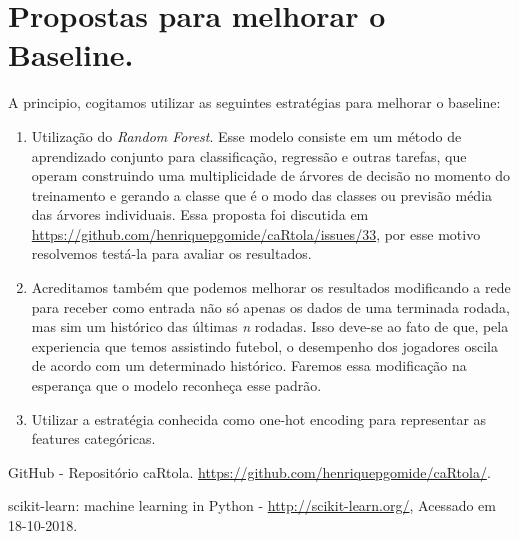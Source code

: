 \documentclass[conference]{IEEEtran}
\begin{document}
\section{Propostas para melhorar o Baseline.}

A  principio,  cogitamos  utilizar   as  seguintes  estratégias  para
melhorar o baseline:

\begin{enumerate}

\item Utilização do \textit{Random  Forest}. Esse modelo consiste em
um método  de aprendizado  conjunto para  classificação, regressão
e  outras  tarefas,  que  operam  construindo  uma  multiplicidade  de
árvores  de   decisão  no  momento   do  treinamento  e   gerando  a
classe   que   é   o   modo   das   classes   ou   previsão   média
das   árvores   individuais.   Essa   proposta   foi   discutida   em
\url{https://github.com/henriquepgomide/caRtola/issues/33},  por  esse
motivo resolvemos testá-la para avaliar os resultados.

\item  Acreditamos   também  que   podemos  melhorar   os  resultados
modificando a rede para receber como  entrada não só apenas os dados
de uma terminada rodada, mas sim um histórico das últimas \textit{n}
rodadas.  Isso deve-se  ao fato  de  que, pela  experiencia que  temos
assistindo futebol, o desempenho dos jogadores oscila de acordo com um
determinado histórico. Faremos essa modificação na esperança que o
modelo reconheça esse padrão.

\item  Utilizar a  estratégia  conhecida como  one-hot encoding  para
representar as features categóricas.

\end{enumerate}

\begin{thebibliography}{00}

      GitHub     -      Repositório     caRtola.
\url{https://github.com/henriquepgomide/caRtola/}.

  scikit-learn:  machine  learning in  Python  -
\url{http://scikit-learn.org/}, Acessado em 18-10-2018.

\end{thebibliography}
\end{document}
